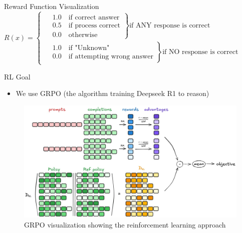 \documentclass[aspectratio=169]{beamer}
\begin{document}
\begin{frame}{Reward Function Visualization}
    \centering
    $R(x) = 
    \begin{cases}
    \left.
    \begin{aligned}
    & 1.0 \quad \text{if correct answer} \\
    & 0.5 \quad \text{if process correct} \\
    & 0.0 \quad \text{otherwise}
    \end{aligned}
    \right\} \text{if ANY response is correct} \\[20pt]
    \left.
    \begin{aligned}
    & 1.0 \quad \text{if "Unknown"} \\
    & 0.0 \quad \text{if attempting wrong answer}
    \end{aligned}
    \right\} \text{if NO response is correct}
    \end{cases}$
\end{frame}

\begin{frame}{RL Goal}
    \begin{itemize}
        \item We use GRPO (the algorithm training Deepseek R1 to reason)
    \end{itemize}
    
    \begin{figure}
        \includegraphics[width=\columnwidth,height=0.65\textheight,keepaspectratio]{images/image1.png}
        \caption{GRPO visualization showing the reinforcement learning approach}
    \end{figure}
\end{frame}
\end{document}
